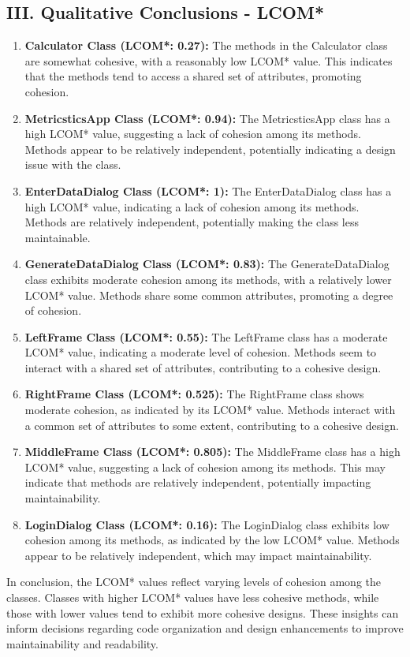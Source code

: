 \documentclass[english,12pt,a4paper]{report}
\begin{document}
	\subsection*{III. Qualitative Conclusions - LCOM*}
	\begin{enumerate}
		\item \textbf{Calculator Class (LCOM*: 0.27):}
		The methods in the Calculator class are somewhat cohesive, with a reasonably low LCOM* value. This indicates that the methods tend to access a shared set of attributes, promoting cohesion.
		
		\item \textbf{MetricsticsApp Class (LCOM*: 0.94):}
		The MetricsticsApp class has a high LCOM* value, suggesting a lack of cohesion among its methods. Methods appear to be relatively independent, potentially indicating a design issue with the class.
		
		\item \textbf{EnterDataDialog Class (LCOM*: 1):}
		The EnterDataDialog class has a high LCOM* value, indicating a lack of cohesion among its methods. Methods are relatively independent, potentially making the class less maintainable.
		
		\item \textbf{GenerateDataDialog Class (LCOM*: 0.83):}
		The GenerateDataDialog class exhibits moderate cohesion among its methods, with a relatively lower LCOM* value. Methods share some common attributes, promoting a degree of cohesion.
		
		\item \textbf{LeftFrame Class (LCOM*: 0.55):}
		The LeftFrame class has a moderate LCOM* value, indicating a moderate level of cohesion. Methods seem to interact with a shared set of attributes, contributing to a cohesive design.
		
		\item \textbf{RightFrame Class (LCOM*: 0.525):}
		The RightFrame class shows moderate cohesion, as indicated by its LCOM* value. Methods interact with a common set of attributes to some extent, contributing to a cohesive design.
		
		\item \textbf{MiddleFrame Class (LCOM*: 0.805):}
		The MiddleFrame class has a high LCOM* value, suggesting a lack of cohesion among its methods. This may indicate that methods are relatively independent, potentially impacting maintainability.
		
		\item \textbf{LoginDialog Class (LCOM*: 0.16):}
		The LoginDialog class exhibits low cohesion among its methods, as indicated by the low LCOM* value. Methods appear to be relatively independent, which may impact maintainability.
	\end{enumerate}
	In conclusion, the LCOM* values reflect varying levels of cohesion among the classes. Classes with higher LCOM* values have less cohesive methods, while those with lower values tend to exhibit more cohesive designs. These insights can inform decisions regarding code organization and design enhancements to improve maintainability and readability.
	
\end{document}
